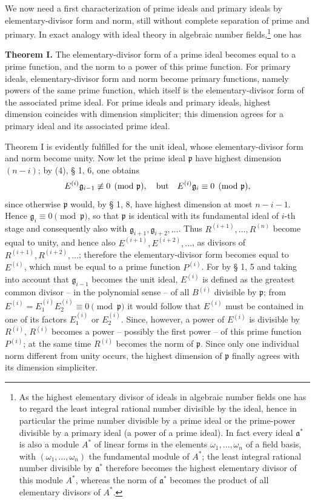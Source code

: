 \documentclass[11pt]{article}
\providecommand{\frakp}{\mathfrak p}
\providecommand{\fraka}{\mathfrak a}
\providecommand{\frakg}{\mathfrak g}
\begin{document}
We now need a first characterization of prime ideals and primary ideals by elementary-divisor form and norm, still without complete separation of prime and primary. In exact analogy with ideal theory in algebraic number fields,\footnote{As the highest elementary divisor of ideals in algebraic number fields one has to regard the least integral rational number divisible by the ideal, hence in particular the prime number divisible by a prime ideal or the prime-power divisible by a primary ideal (a power of a prime ideal). In fact every ideal $\fraka^*$ is also a module $A^*$ of linear forms in the elements $\omega_1,\ldots,\omega_n$ of a field basis, with $(\omega_1,\ldots,\omega_n)$ the fundamental module of $A^*$; the least integral rational number divisible by $\fraka^*$ therefore becomes the highest elementary divisor of this module $A^*$, whereas the norm of $\fraka^*$ becomes the product of all elementary divisors of $A^*$.} one has

\textbf{Theorem I.} The elementary-divisor form of a prime ideal becomes equal to a prime function, and the norm to a power of this prime function. For primary ideals, elementary-divisor form and norm become primary functions, namely powers of the same prime function, which itself is the elementary-divisor form of the associated prime ideal. For prime ideals and primary ideals, highest dimension coincides with dimension simpliciter; this dimension agrees for a primary ideal and its associated prime ideal.

Theorem I is evidently fulfilled for the unit ideal, whose elementary-divisor form and norm become unity. Now let the prime ideal $\frakp$ have highest dimension $(n-i)$; by (4), § 1, 6, one obtains
\[
 E^{(i)}\frakg_{i-1}\not\equiv0\pmod{\frakp},\quad\hbox{but}\quad
 E^{(i)}\frakg_i\equiv0\pmod{\frakp},
\]
since otherwise $\frakp$ would, by § 1, 8, have highest dimension at most $n-i-1$. Hence $\frakg_i\equiv0\pmod{\frakp}$, so that $\frakp$ is identical with its fundamental ideal of $i$-th stage and consequently also with $\frakg_{i+1},\frakg_{i+2},\ldots$. Thus $R^{(i+1)},\ldots,R^{(n)}$ become equal to unity, and hence also $E^{(i+1)},E^{(i+2)},\ldots$, as divisors of $R^{(i+1)},R^{(i+2)},\ldots$; therefore the elementary-divisor form becomes equal to $E^{(i)}$, which must be equal to a prime function $P^{(i)}$. For by § 1, 5 and taking into account that $\frakg_{i-1}$ becomes the unit ideal, $E^{(i)}$ is defined as the greatest common divisor -- in the polynomial sense -- of all $B^{(i)}$ divisible by $\frakp$; from $E^{(i)}=E_1^{(i)}E_2^{(i)}\equiv0\pmod{\frakp}$ it would follow that $E^{(i)}$ must be contained in one of its factors $E_1^{(i)}$ or $E_2^{(i)}$. Since, however, a power of $E^{(i)}$ is divisible by $R^{(i)}$, $R^{(i)}$ becomes a power -- possibly the first power -- of this prime function $P^{(i)}$; at the same time $R^{(i)}$ becomes the norm of $\frakp$. Since only one individual norm different from unity occurs, the highest dimension of $\frakp$ finally agrees with its dimension simpliciter.
\end{document}
